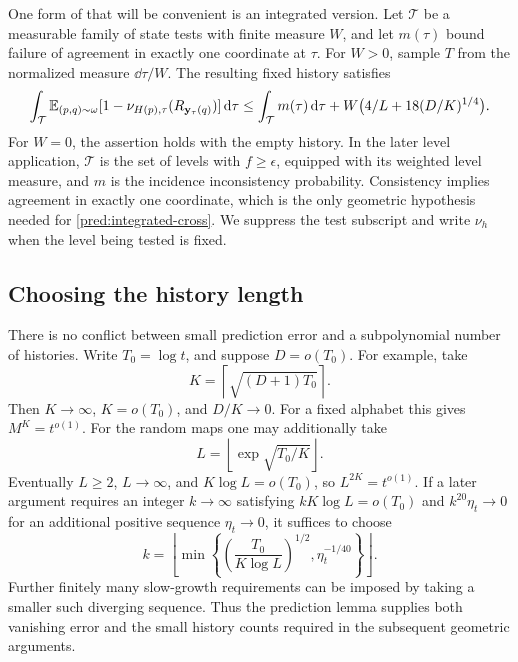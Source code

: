One form of  that will be convenient is an integrated
version.  Let \(\mathcal T\) be a measurable family of state tests with finite
measure \(W\), and let \(m(\tau)\) bound failure of agreement in exactly one coordinate at
\(\tau\).  For \(W>0\), sample \(T\) from the normalized measure
\(\dd\tau/W\).  The resulting fixed history satisfies
\begin{equation}\label{pred:integrated-cross}
 \int_{\mathcal T}\mathbb E_{(p,q)\sim\omega}
 [1-\nu_{H(p),\tau}(R_{\mathbf y_\tau(q)})]\,\mathrm d\tau
 \le\int_{\mathcal T}m(\tau)\,\mathrm d\tau
       +W\bigl(4/L+18(D/K)^{1/4}\bigr).
\end{equation}
For \(W=0\), the assertion holds with the empty history.  In the later level
application, \(\mathcal T\) is the set of levels with $f\ge\epsilon$, equipped with its weighted level
measure, and \(m\) is the incidence inconsistency probability.  Consistency
implies agreement in exactly one coordinate, which is the only geometric hypothesis
needed for \eqref{pred:integrated-cross}.  We suppress the test subscript and
write \(\nu_h\) when the level being tested is fixed.

\subsection{Choosing the history length}\label{sec:history-length}

There is no conflict between small prediction error and a subpolynomial
number of histories.  Write \(T_0=\log t\), and suppose \(D=o(T_0)\).
For example, take
\[
 K=\left\lceil\sqrt{(D+1)T_0}\right\rceil.
\]
Then \(K\to\infty\), \(K=o(T_0)\), and \(D/K\to0\).
For a fixed alphabet this gives \(M^K=t^{o(1)}\).
For the random maps one may additionally take
\[
 L=\left\lfloor\exp\sqrt{T_0/K}\right\rfloor.
\]
Eventually \(L\ge2\), \(L\to\infty\), and
\(K\log L=o(T_0)\), so \(L^{2K}=t^{o(1)}\).
If a later argument requires an integer \(k\to\infty\) satisfying
\(kK\log L=o(T_0)\) and \(k^{20}\eta_t\to0\) for an additional positive
sequence \(\eta_t\to0\), it suffices to choose
\[
 k=\left\lfloor\min\left\{
       \left(\frac{T_0}{K\log L}\right)^{1/2},
       \eta_t^{-1/40}\right\}\right\rfloor.
\]
Further finitely many slow-growth requirements can be imposed by taking a
smaller such diverging sequence.  Thus the prediction lemma supplies both
vanishing error and the small history counts required in the subsequent
geometric arguments.

